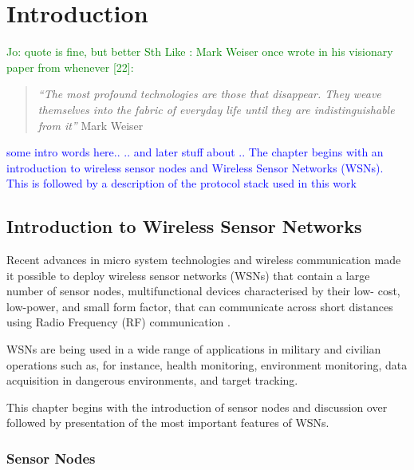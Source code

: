 \chapter{Introduction}

\textcolor{green}{Jo: quote is fine, but better Sth Like : Mark Weiser once
wrote in his visionary paper from whenever [22]:}

\begin{quote}
\emph{``The most profound technologies are those that disappear. They weave
themselves into the fabric of everyday life until they are indistinguishable
from it''} 
Mark Weiser \cite{Weiser_ComputerIn21stCentury}
\end{quote}


\textcolor{blue}{some intro words here.. .. and later stuff about .. The chapter
begins with an introduction to wireless sensor nodes and Wireless Sensor Networks (WSNs). This is followed by a
description of the protocol stack used in this work}



\section{Introduction to Wireless Sensor Networks}

Recent advances in micro system technologies and wireless communication
made it possible to deploy wireless sensor networks (WSNs) that contain a large
number of sensor nodes, multifunctional devices characterised by their low- cost,
low-power, and small form factor, that can communicate across short distances
using Radio Frequency (RF) communication \cite{SensorSurveyAkyildiz:2002}.

WSNs are being used in a wide range of applications in military and civilian
operations such as, for instance, health monitoring, environment monitoring,
data acquisition in dangerous environments, and target tracking.

This chapter begins with the introduction of sensor nodes and
discussion over followed by presentation of the most important features of WSNs.

\subsection{Sensor Nodes} \label{subsec:sensornodes}

